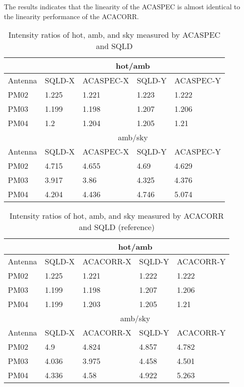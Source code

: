 The results indicates that the linearity of the ACASPEC is almost identical to the linearity performance of the ACACORR.

\begin{table}[]
\centering
\caption{Intensity ratios of hot, amb, and sky measured by ACASPEC and SQLD}\label{tab:linearity_ACAS}

\begin{tabular}{lllll}
\hline \hline
                 & \multicolumn{4}{c}{hot/amb}       \\ \hline
Antenna          & SQLD-X & ACASPEC-X & SQLD-Y & ACASPEC-Y \\ \hline
PM02             & 1.225  & 1.221  & 1.223  & 1.222  \\
PM03             & 1.199  & 1.198  & 1.207  & 1.206  \\
PM04             & 1.2    & 1.204  & 1.205  & 1.21   \\ \hline
                 & \multicolumn{4}{c}{amb/sky}       \\ \hline
Antenna          & SQLD-X & ACASPEC-X & SQLD-Y & ACASPEC-Y \\ \hline
PM02             & 4.715  & 4.655  & 4.69   & 4.629  \\
PM03             & 3.917  & 3.86   & 4.325  & 4.376  \\
PM04             & 4.204  & 4.436  & 4.746  & 5.074  \\ \hline \hline
\end{tabular}
\end{table}

\begin{table}[]
\centering
\caption{Intensity ratios of hot, amb, and sky measured by ACACORR and SQLD (reference)}\label{tab:linearity_ACAC}
\begin{tabular}{lllll}
\hline \hline
                 & \multicolumn{4}{c}{hot/amb}       \\ \hline
Antenna & SQLD-X & ACACORR-X & SQLD-Y & ACACORR-Y \\
PM02    & 1.225  & 1.221  & 1.222  & 1.222  \\
PM03    & 1.199  & 1.198  & 1.207  & 1.206  \\
PM04    & 1.199  & 1.203  & 1.205  & 1.21   \\ \hline
                 & \multicolumn{4}{c}{amb/sky}       \\ \hline
Antenna & SQLD-X & ACACORR-X & SQLD-Y & ACACORR-Y \\
PM02    & 4.9    & 4.824  & 4.857  & 4.782  \\
PM03    & 4.036  & 3.975  & 4.458  & 4.501  \\
PM04    & 4.336  & 4.58   & 4.922  & 5.263  \\ \hline \hline
\end{tabular}
\end{table}

